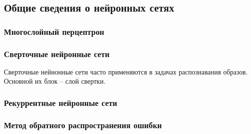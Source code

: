 \subsection{Общие сведения о нейронных сетях}
\subsubsection{Многослойный перцептрон}
\subsubsection{Сверточные нейронные сети}
Сверточные нейнонные сети часто применяются в задачах распознавания образов.
Основной их блок -- слой свертки.
\subsubsection{Рекуррентные нейронные сети}
\subsubsection{Метод обратного распространения ошибки}

